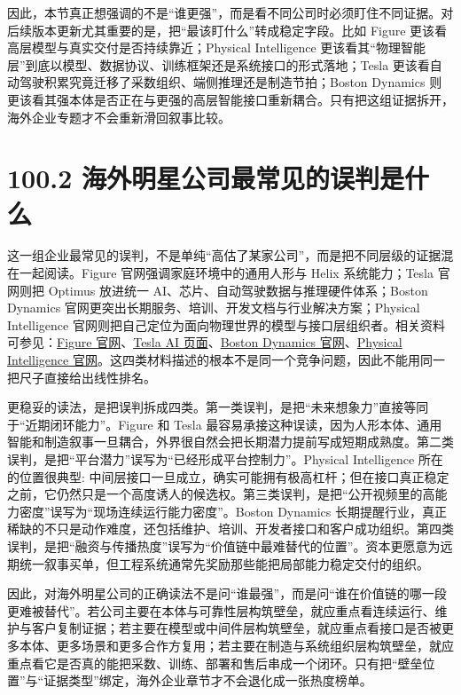因此，本节真正想强调的不是“谁更强”，而是看不同公司时必须盯住不同证据。对后续版本更新尤其重要的是，把“最该盯什么”转成稳定字段。比如 Figure 更该看高层模型与真实交付是否持续靠近；Physical Intelligence 更该看其“物理智能层”到底以模型、数据协议、训练框架还是系统接口的形式落地；Tesla 更该看自动驾驶积累究竟迁移了采数组织、端侧推理还是制造节拍；Boston Dynamics 则更该看其强本体是否正在与更强的高层智能接口重新耦合。只有把这组证据拆开，海外企业专题才不会重新滑回叙事比较。

\section*{100.2 海外明星公司最常见的误判是什么}


这一组企业最常见的误判，不是单纯“高估了某家公司”，而是把不同层级的证据混在一起阅读。Figure 官网强调家庭环境中的通用人形与 Helix 系统能力；Tesla 官网则把 Optimus 放进统一 AI、芯片、自动驾驶数据与推理硬件体系；Boston Dynamics 官网更突出长期服务、培训、开发文档与行业解决方案；Physical Intelligence 官网则把自己定位为面向物理世界的模型与接口层组织者。相关资料可参见：\href{https://www.figure.ai/}{Figure 官网}、\href{https://www.tesla.com/AI}{Tesla AI 页面}、\href{https://bostondynamics.com/}{Boston Dynamics 官网}、\href{https://www.physicalintelligence.company/}{Physical Intelligence 官网}。这四类材料描述的根本不是同一个竞争问题，因此不能用同一把尺子直接给出线性排名。

更稳妥的读法，是把误判拆成四类。第一类误判，是把“未来想象力”直接等同于“近期闭环能力”。Figure 和 Tesla 最容易承接这种误读，因为人形本体、通用智能和制造叙事一旦耦合，外界很自然会把长期潜力提前写成短期成熟度。第二类误判，是把“平台潜力”误写为“已经形成平台控制力”。Physical Intelligence 所在的位置很典型: 中间层接口一旦成立，确实可能拥有极高杠杆；但在接口真正稳定之前，它仍然只是一个高度诱人的候选权。第三类误判，是把“公开视频里的高能力密度”误写为“现场连续运行能力密度”。Boston Dynamics 长期提醒行业，真正稀缺的不只是动作难度，还包括维护、培训、开发者接口和客户成功组织。第四类误判，是把“融资与传播热度”误写为“价值链中最难替代的位置”。资本更愿意为远期统一叙事买单，但工程系统通常先奖励那些能把局部能力稳定交付的组织。

因此，对海外明星公司的正确读法不是问“谁最强”，而是问“谁在价值链的哪一段更难被替代”。若公司主要在本体与可靠性层构筑壁垒，就应重点看连续运行、维护与客户复制证据；若主要在模型或中间件层构筑壁垒，就应重点看接口是否被更多本体、更多场景和更多合作方复用；若主要在制造与系统组织层构筑壁垒，就应重点看它是否真的能把采数、训练、部署和售后串成一个闭环。只有把“壁垒位置”与“证据类型”绑定，海外企业章节才不会退化成一张热度榜单。

